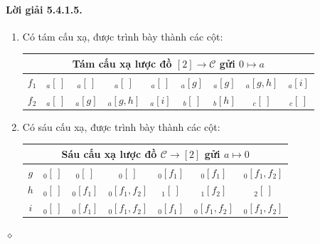\paragraph{Lời giải 5.4.1.5.}
\begin{enumerate}[label=\alph*.]
\item Có tám cấu xạ, được trình bày thành các cột:
\begin{center}\footnotesize\setlength{\tabcolsep}{3pt}\begin{tabular}{|c|c|c|c|c|c|c|c|c|}\hline\multicolumn{9}{|c|}{Tám cấu xạ lược đồ $[2]\to\mathcal C$ gửi $0\mapsto a$}\\\hline$f_1$&${}_{a}[\,]$&${}_{a}[\,]$&${}_{a}[\,]$&${}_{a}[\,]$&${}_{a}[g]$&${}_{a}[g]$&${}_{a}[g,h]$&${}_{a}[i]$\\$f_2$&${}_{a}[\,]$&${}_{a}[g]$&${}_{a}[g,h]$&${}_{a}[i]$&${}_{b}[\,]$&${}_{b}[h]$&${}_{c}[\,]$&${}_{c}[\,]$\\\hline\end{tabular}\end{center}
\item Có sáu cấu xạ, được trình bày thành các cột:
\begin{center}\footnotesize\setlength{\tabcolsep}{3pt}\begin{tabular}{|c|c|c|c|c|c|c|}\hline\multicolumn{7}{|c|}{Sáu cấu xạ lược đồ $\mathcal C\to[2]$ gửi $a\mapsto0$}\\\hline$g$&${}_{0}[\,]$&${}_{0}[\,]$&${}_{0}[\,]$&${}_{0}[f_1]$&${}_{0}[f_1]$&${}_{0}[f_1,f_2]$\\$h$&${}_{0}[\,]$&${}_{0}[f_1]$&${}_{0}[f_1,f_2]$&${}_{1}[\,]$&${}_{1}[f_2]$&${}_{2}[\,]$\\$i$&${}_{0}[\,]$&${}_{0}[f_1]$&${}_{0}[f_1,f_2]$&${}_{0}[f_1]$&${}_{0}[f_1,f_2]$&${}_{0}[f_1,f_2]$\\\hline\end{tabular}\end{center}
\end{enumerate}\hfill$\diamond$
